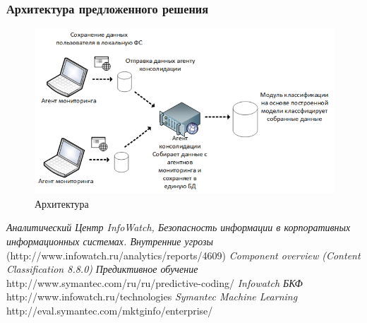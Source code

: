 \documentclass[russian, utf8, emptystyle]{eskdtext}
\begin{document}
\subsubsection{Архитектура предложенного решения}
\begin{figure}[h]
	\begin{center}
		\includegraphics[width=14cm]{pic/arch.png}
		\caption{Архитектура}
		\label{fig:low_sigma}
	\end{center}
\end{figure}
\begin{thebibliography}{50}
	\textit {Аналитический Центр InfoWatch, Безопасность информации в корпоративных информационных системах. Внутренние угрозы}
	{(http://www.infowatch.ru/analytics/reports/4609)}
	\textit {Component overview (Content Classification 8.8.0)}
	\textit {Предиктивное обучение}
	{http://www.symantec.com/ru/ru/predictive-coding/}
	\textit {Infowatch БКФ }
	{http://www.infowatch.ru/technologies}
	\textit {Symantec Machine Learning}
	{http://eval.symantec.com/mktginfo/enterprise/}
	
\end{thebibliography}
\end{document}
